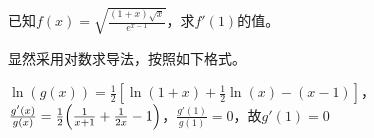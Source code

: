 \begin{problem}
	已知$f(x)=\sqrt{\frac{(1+x)\sqrt{x}}{e^{x-1}}}$，求$f'(1)$的值。
	\begin{solution}
		显然采用对数求导法，按照如下格式。
		
		$\ln(g(x))=\frac{1}{2}[\ln(1+x)+\frac{1}{2}\ln(x)-(x-1)]$，$\frac{g'(x)}{g(x)}=\frac{1}{2}\qty(\frac{1}{x+1}+\frac{1}{2x}-1)$，$\frac{g'(1)}{g(1)}=0$，故$g'(1)=0$
	\end{solution}
\end{problem}